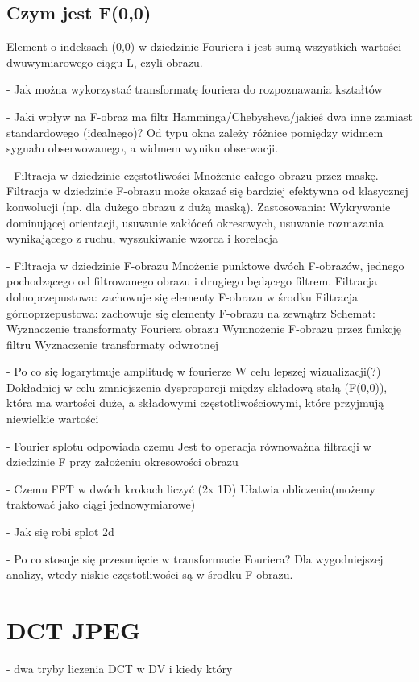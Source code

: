 \documentclass[a4paper, 12pt, titlepage]{article}
\begin{document}
\subsection{Czym jest F(0,0)}
Element o indeksach (0,0) w dziedzinie Fouriera i jest sumą wszystkich wartości dwuwymiarowego ciągu L, czyli obrazu.

- Jak można wykorzystać transformatę fouriera do rozpoznawania kształtów


- Jaki wpływ na F-obraz ma filtr Hamminga/Chebysheva/jakieś dwa inne zamiast standardowego (idealnego)?
Od typu okna zależy różnice pomiędzy widmem sygnału obserwowanego, a widmem wyniku obserwacji.

- Filtracja w dziedzinie częstotliwości
Mnożenie całego obrazu przez maskę.
Filtracja w dziedzinie F-obrazu może okazać się bardziej efektywna od klasycznej konwolucji (np. dla dużego obrazu z dużą maską).
Zastosowania:
Wykrywanie dominującej orientacji, usuwanie zakłóceń okresowych, usuwanie rozmazania wynikającego z ruchu, wyszukiwanie wzorca i korelacja

- Filtracja w dziedzinie F-obrazu
Mnożenie punktowe dwóch F-obrazów, jednego pochodzącego od filtrowanego obrazu i drugiego będącego filtrem.
Filtracja dolnoprzepustowa: zachowuje się elementy F-obrazu w środku
Filtracja górnoprzepustowa: zachowuje się elementy F-obrazu na zewnątrz
Schemat:
Wyznaczenie transformaty Fouriera obrazu
Wymnożenie F-obrazu przez funkcję filtru
Wyznaczenie transformaty odwrotnej

- Po co się logarytmuje amplitudę w fourierze
W celu lepszej wizualizacji(?)
Dokładniej w celu zmniejszenia dysproporcji między składową stałą (F(0,0)), która ma wartości duże, a składowymi częstotliwościowymi, które przyjmują niewielkie wartości

- Fourier splotu odpowiada czemu
Jest to operacja równoważna filtracji w dziedzinie F przy założeniu okresowości obrazu

- Czemu FFT w dwóch krokach liczyć (2x 1D)
Ułatwia obliczenia(możemy traktować jako ciągi jednowymiarowe)

- Jak się robi splot 2d


- Po co stosuje się przesunięcie w transformacie Fouriera?
Dla wygodniejszej analizy, wtedy niskie częstotliwości są w środku F-obrazu.
\pagebreak\section{DCT JPEG}
- dwa tryby liczenia DCT w DV i kiedy który
\end{document}
